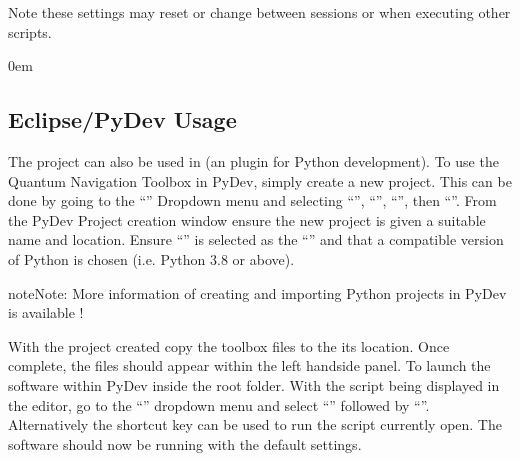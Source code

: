 \documentclass[letterpaper,10pt,english]{sphinxmanual}
\let\sphinxpxdimen\pdfpxdimen\else\newdimen\sphinxpxdimen
\begin{document}
\sphinxAtStartPar
Note these settings may reset or change between sessions or when executing other scripts.

\begin{DUlineblock}{0em}
\item[] 
\end{DUlineblock}


\subsection{Eclipse/PyDev Usage}
\label{\detokenize{usage/execution:eclipse-pydev-usage}}
\noindent{\hspace*{\fill}\sphinxincludegraphics[height=60\sphinxpxdimen]{{pydev_icon}.png}\hspace*{\fill}}

\sphinxAtStartPar
The project can also be used in  (an 
plug\sphinxhyphen{}in for Python development). To use the Quantum Navigation Toolbox in PyDev, simply create a new project. This can
be done by going to the “” Dropdown menu and selecting “”, “”, “”, then
“”.
From the PyDev Project creation window ensure the new project is given a suitable name and location. Ensure
“” is selected as the “” and that a compatible version of Python is chosen
(i.e. Python 3.8 or above).

\begin{sphinxadmonition}{note}{Note:}
\sphinxAtStartPar
More information of creating and importing Python projects in PyDev is available
!
\end{sphinxadmonition}

\sphinxAtStartPar
With the project created copy the toolbox files to the its location. Once complete, the files should
appear within the left hand\sphinxhyphen{}side panel. To launch the software within PyDev  
inside the root folder. With the script  being displayed in the editor, go to the “” dropdown menu
and select “” followed by “”. Alternatively the shortcut key  can be used to run the
script currently open. The software should now be running with the default settings.
\end{document}
